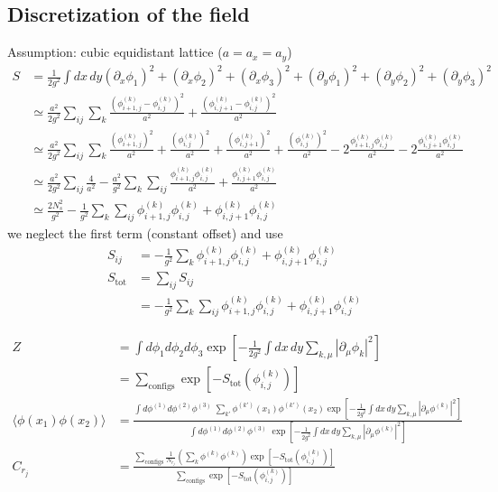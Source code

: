 \documentclass[10pt,a4paper]{article}
\theoremstyle{definition}
\begin{document}
\subsection{Discretization of the field}
Assumption: cubic equidistant lattice ($a=a_x=a_y$)
\begin{align}
S&=\frac{1}{2g^2}\int dx\,dy (\partial_x\phi_1)^2+(\partial_x\phi_2)^2+(\partial_x\phi_3)^2+(\partial_y\phi_1)^2+(\partial_y\phi_2)^2+(\partial_y\phi_3)^2\\
&\simeq\frac{a^2}{2g^2}\sum_{ij}\sum_{k}\frac{(\phi^{(k)}_{i+1,j}-\phi^{(k)}_{i,j})^2}{a^2}+\frac{(\phi^{(k)}_{i,j+1}-\phi^{(k)}_{i,j})^2}{a^2}\\
&\simeq\frac{a^2}{2g^2}\sum_{ij}\sum_{k}
\frac{(\phi^{(k)}_{i+1,j})^2}{a^2}
+\frac{(\phi^{(k)}_{i,j})^2}{a^2}
+\frac{(\phi^{(k)}_{i,j+1})^2}{a^2}
+\frac{(\phi^{(k)}_{i,j})^2}{a^2}
-2\frac{\phi^{(k)}_{i+1,j}\phi^{(k)}_{i,j}}{a^2}
-2\frac{\phi^{(k)}_{i,j+1}\phi^{(k)}_{i,j}}{a^2}\\
&\simeq
\frac{a^2}{2g^2}\sum_{ij}\frac{4}{a^2}
-\frac{a^2}{g^2}\sum_{k}\sum_{ij}
\frac{\phi^{(k)}_{i+1,j}\phi^{(k)}_{i,j}}{a^2}
+\frac{\phi^{(k)}_{i,j+1}\phi^{(k)}_{i,j}}{a^2}\\
&\simeq
\frac{2N_s^2}{g^2}
-\frac{1}{g^2}\sum_{k}\sum_{ij}
\phi^{(k)}_{i+1,j}\phi^{(k)}_{i,j}
+\phi^{(k)}_{i,j+1}\phi^{(k)}_{i,j}
\end{align}
we neglect the first term (constant offset) and use
\begin{align}
S_{ij}
&=-\frac{1}{g^2}\sum_{k}
\phi^{(k)}_{i+1,j}\phi^{(k)}_{i,j}
+\phi^{(k)}_{i,j+1}\phi^{(k)}_{i,j}\\
S_\text{tot}
&=\sum_{ij}S_{ij}\\
&=-\frac{1}{g^2}\sum_{k}\sum_{ij}
\phi^{(k)}_{i+1,j}\phi^{(k)}_{i,j}
+\phi^{(k)}_{i,j+1}\phi^{(k)}_{i,j}
\end{align}

\begin{align}
Z
&=\int d\phi_1d\phi_2d\phi_3\exp\left[-\frac{1}{2g^2}\int dx\,dy \sum_{k,\mu}|\partial_\mu\phi_k|^2\right]\\
&=\sum_\text{configs}\exp{[-S_\text{tot}(\phi^{(k)}_{i,j})]}\\
\langle\phi(x_1)\phi(x_2)\rangle
&=\frac{\int d\phi^{(1)}d\phi^{(2)}\phi^{(3)}\;\sum_{k'}\phi^{(k')}(x_1)\phi^{(k')}(x_2)\exp\left[-\frac{1}{2g^2}\int dx\,dy \sum_{k,\mu}|\partial_\mu\phi^{(k)}|^2\right]}
{\int d\phi^{(1)}d\phi^{(2)}\phi^{(3)}\;\exp\left[-\frac{1}{2g^2}\int dx\,dy \sum_{k,\mu}|\partial_\mu\phi^{(k)}|^2\right]}\\
C_{r_j}&=\frac{\sum_\text{configs}\frac{1}{N_{r_j}}\left(\sum_k\phi^{(k)}\phi^{(k)}\right)\exp{[-S_\text{tot}(\phi^{(k)}_{i,j})]}}{\sum_\text{configs}\exp{[-S_\text{tot}(\phi^{(k)}_{i,j})]}}
\end{align}
\end{document}
